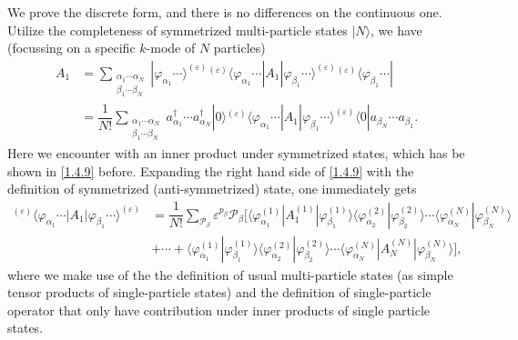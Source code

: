 \documentclass[b5paper,10pt,UTF8]{book}
\numberwithin{equation}{section}
\begin{document}
		\begin{Proof}
			We prove the discrete form, and there is no differences on the continuous one. Utilize the completeness of symmetrized multi-particle states $|N\rangle$, we have (focussing on a specific $k$-mode of $N$ particles)
			\begin{align}
				A_1&=\sum_{\substack{\alpha_1\cdots\alpha_N\\\beta_1\cdots\beta_N}}|\varphi_{\alpha_1}\cdots\rangle^{(\varepsilon)}{}^{(\varepsilon)}\langle\varphi_{\alpha_1}\cdots|A_1|\varphi_{\beta_1}\cdots\rangle^{(\varepsilon)}{}^{(\varepsilon)}\langle\varphi_{\beta_1}\cdots|\label{1.5.3}\\
	 			&=\dfrac{1}{N!}\sum_{\substack{\alpha_1\cdots\alpha_N\\\beta_1\cdots\beta_N}}a_{\alpha_1}^\dagger\cdots a_{\alpha_N}^\dagger|0\rangle{}^{(\varepsilon)}\langle\varphi_{\alpha_1}\cdots|A_1|\varphi_{\beta_1}\cdots\rangle^{(\varepsilon)}\langle0|a_{\beta_N}\cdots a_{\beta_1}.\label{1.5.4}
			\end{align}
			Here we encounter with an inner product under symmetrized states, which has be shown in \eqref{1.4.9} before. Expanding the right hand side of \eqref{1.4.9} with the definition of symmetrized (anti-symmetrized) state, one immediately gets
			\begin{align}
				{}^{(\varepsilon)}\langle\varphi_{\alpha_1}\cdots|A_1|\varphi_{\beta_1}\cdots\rangle^{(\varepsilon)}&=\dfrac{1}{N!}\sum_{\mathcal{P}_\beta}\varepsilon^{p_\beta}\mathcal{P}_\beta\bigg[\langle\varphi_{\alpha_1}^{(1)}|A^{(1)}_1|\varphi_{\beta_1}^{(1)}\rangle\langle\varphi_{\alpha_2}^{(2)}|\varphi_{\beta_2}^{(2)}\rangle\cdots\langle\varphi_{\alpha_N}^{(N)}|\varphi_{\beta_N}^{(N)}\rangle\nonumber\\
				&+\cdots+\langle\varphi_{\alpha_1}^{(1)}|\varphi_{\beta_1}^{(1)}\rangle\langle\varphi_{\alpha_2}^{(2)}|\varphi_{\beta_2}^{(2)}\rangle\cdots\langle\varphi_{\alpha_N}^{(N)}|A^{(N)}_N|\varphi_{\beta_N}^{(N)}\rangle\bigg],\label{1.5.5}
			\end{align}
			where we make use of the the definition of usual multi-particle states (as simple tensor products of single-particle states) and the definition of single-particle operator that only have contribution under inner products of single particle states.\par

\end{Proof}
\end{document}
